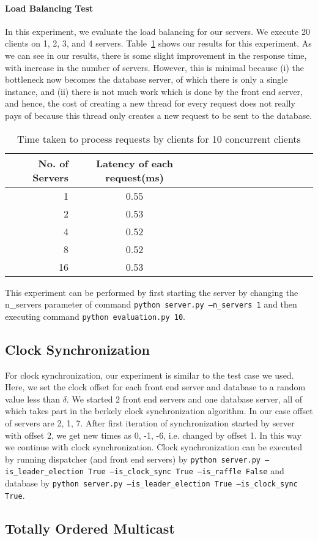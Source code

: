 \documentclass{article}
\begin{document}
\paragraph{Load Balancing Test} In this experiment,
we evaluate the load balancing for our servers. We execute 20 clients on
1, 2, 3, and 4 servers.
Table~\ref{tab:load-balancing} shows our results for this experiment.
As we can see in our results, there is some slight improvement in the response
time, with increase in the number of servers. However, this is minimal 
because (i) the bottleneck now becomes the database server, of which there is only
a single instance, and (ii) there is not much work which is done by the front
end server, and hence, the cost of creating a new thread for every request
does not really pays of because this thread only creates a new request to be sent to the 
database.
\begin{table}
    \small
\begin{tabularx}{\linewidth}{rccccccccccccc}
\toprule
No. of Servers &Latency of each request(ms)\\
\midrule
1&0.55\\
2&0.53\\
4&0.52\\
8&0.52\\
16&0.53\\
\bottomrule
\end{tabularx}
\caption{Time taken to process requests by clients for 10 concurrent clients}
\label{tab:load-balancing}
\end{table}

This experiment can be performed by first starting the server by changing
the n\_servers parameter of command {\tt python server.py --n\_servers 1} and then 
executing command {\tt python evaluation.py 10}.
\subsection{Clock Synchronization}
For clock synchronization, our experiment is similar to the test case we used.
Here, we set the clock offset for each front end server and database to a 
random value less than $\delta$. We started 2 front end servers and one 
database server, all of which takes part in the berkely clock synchronization
algorithm. In our case offset of servers are 2, 1, 7. After first iteration 
of synchronization started by server with offset 2, we get new times as
0, -1, -6, i.e. changed by offset 1. In this way we continue with 
clock synchronization. Clock synchronization can be executed by
running dispatcher (and front end servers) by {\tt python server.py --is\_leader\_election True --is\_clock\_sync True --is\_raffle False}
and database by {\tt python server.py --is\_leader\_election True --is\_clock\_sync True}.

\subsection{Totally Ordered Multicast}
\end{document}
